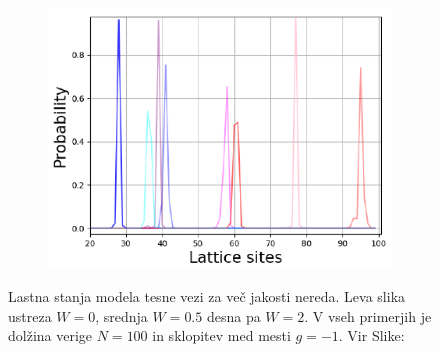 \begin{figure}[H]
\begin{subfigure}{.33\textwidth}
\includegraphics[width=\linewidth]{Figures/Anderson2.pdf}
\end{subfigure}
\caption{Lastna stanja modela tesne vezi za več jakosti nereda. Leva slika ustreza $W=0$, srednja $W=0.5$ desna pa $W=2$. V vseh primerjih je dolžina verige $N=100$ in sklopitev med mesti $g=-1$. Vir Slike: \cite{anderson}}
\label{fig:AndersonW}
\end{figure}

